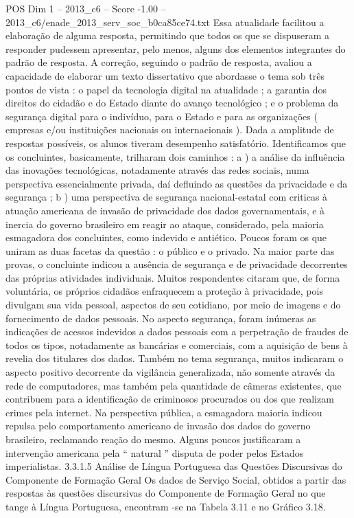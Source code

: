 \begin{textsample}{POS Dim 1 – 2013\_c6 – Score -1.00 – 2013\_c6/enade\_2013\_serv\_soc\_b0ca85ce74.txt}
Essa atualidade facilitou a elaboração de alguma resposta, permitindo que todos os que se dispuseram a responder pudessem apresentar, pelo menos, alguns dos elementos integrantes do padrão de resposta.
A correção, seguindo o padrão de resposta, avaliou a capacidade de elaborar um texto dissertativo que abordasse o tema sob três pontos de vista : o papel da tecnologia digital na atualidade ; a garantia dos direitos do cidadão e do Estado diante do avanço tecnológico ; e o problema da segurança digital para o indivíduo, para o Estado e para as organizações ( empresas e/ou instituições nacionais ou internacionais ).
Dada a amplitude de respostas possíveis, os alunos tiveram desempenho satisfatório.
Identificamos que os concluintes, basicamente, trilharam dois caminhos : a ) a análise da influência das inovações tecnológicas, notadamente através das redes sociais, numa perspectiva essencialmente privada, daí defluindo as questões da privacidade e da segurança ; b ) uma perspectiva de segurança nacional-estatal com criticas à atuação americana de invasão de privacidade dos dados governamentais, e à inercia do governo brasileiro em reagir ao ataque, considerado, pela maioria esmagadora dos concluintes, como indevido e antiético.
Poucos foram os que uniram as duas facetas da questão : o público e o privado.
Na maior parte das provas, o concluinte indicou a ausência de segurança e de privacidade decorrentes das próprias atividades individuais.
Muitos respondentes citaram que, de forma voluntária, os próprios cidadãos enfraquecem a proteção à privacidade, pois divulgam sua vida pessoal, aspectos de seu cotidiano, por meio de imagens e do fornecimento de dados pessoais.
No aspecto segurança, foram inúmeras as indicações de acessos indevidos a dados pessoais com a perpetração de fraudes de todos os tipos, notadamente as bancárias e comerciais, com a aquisição de bens à revelia dos titulares dos dados.
Também no tema segurança, muitos indicaram o aspecto positivo decorrente da vigilância generalizada, não somente através da rede de computadores, mas também pela quantidade de câmeras existentes, que contribuem para a identificação de criminosos procurados ou dos que realizam crimes pela internet.
Na perspectiva pública, a esmagadora maioria indicou repulsa pelo comportamento americano de invasão dos dados do governo brasileiro, reclamando reação do mesmo.
Alguns poucos justificaram a intervenção americana pela “ natural ” disputa de poder pelos Estados imperialistas. 3.3.1.5 Análise de Língua Portuguesa das Questões Discursivas do Componente de Formação Geral Os dados de Serviço Social, obtidos a partir das respostas às questões discursivas do Componente de Formação Geral no que tange à Língua Portuguesa, encontram -se na Tabela 3.11 e no Gráfico 3.18.

\end{textsample}
